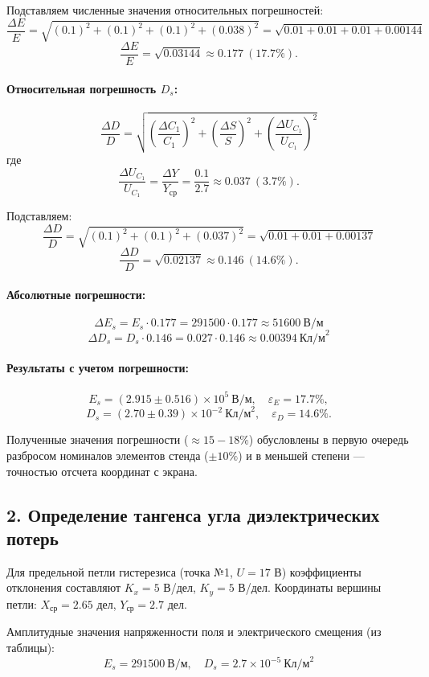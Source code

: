 \documentclass[a4paper,14pt]{article}
\begin{document}
Подставляем численные значения относительных погрешностей:
\[
\frac{\Delta E}{E} = \sqrt{ (0.1)^2 + (0.1)^2 + (0.1)^2 + (0.038)^2 } = \sqrt{ 0.01 + 0.01 + 0.01 + 0.00144 }
\]
\[
\frac{\Delta E}{E} = \sqrt{0.03144} \approx 0.177 \ (17.7\%).
\]

\paragraph{Относительная погрешность \(D_s\):}
\[
\frac{\Delta D}{D} = \sqrt{ \left( \frac{\Delta C_1}{C_1} \right)^2 + \left( \frac{\Delta S}{S} \right)^2 + \left( \frac{\Delta U_{C_1}}{U_{C_1}} \right)^2 }
\]
где
\[
\frac{\Delta U_{C_1}}{U_{C_1}} = \frac{\Delta Y}{Y_{ср}} = \frac{0.1}{2.7} \approx 0.037 \ (3.7\%).
\]

Подставляем:
\[
\frac{\Delta D}{D} = \sqrt{ (0.1)^2 + (0.1)^2 + (0.037)^2 } = \sqrt{ 0.01 + 0.01 + 0.00137 }
\]
\[
\frac{\Delta D}{D} = \sqrt{0.02137} \approx 0.146 \ (14.6\%).
\]

\paragraph{Абсолютные погрешности:}
\[
\Delta E_s = E_s \cdot 0.177 = 291500 \cdot 0.177 \approx 51600 \ \text{В/м}
\]
\[
\Delta D_s = D_s \cdot 0.146 = 0.027 \cdot 0.146 \approx 0.00394 \ \text{Кл/м}^2
\]

\paragraph{Результаты с учетом погрешности:}
\[
E_s = (2.915 \pm 0.516) \times 10^5 \ \text{В/м}, \quad \varepsilon_E = 17.7\%,
\]
\[
D_s = (2.70 \pm 0.39) \times 10^{-2} \ \text{Кл/м}^2, \quad \varepsilon_D = 14.6\%.
\]

Полученные значения погрешности (\(\approx 15-18\%\)) обусловлены в первую очередь разбросом номиналов элементов стенда (\(\pm 10\%\)) и в меньшей степени — точностью отсчета координат с экрана.
\subsection*{2. Определение тангенса угла диэлектрических потерь}

Для предельной петли гистерезиса (точка №1, \(U = 17\) В) коэффициенты отклонения составляют \(K_x = 5\) В/дел, \(K_y = 5\) В/дел. Координаты вершины петли: \(X_{ср} = 2.65\) дел, \(Y_{ср} = 2.7\) дел.

Амплитудные значения напряженности поля и электрического смещения (из таблицы):
\[
E_s = 291500 \ \text{В/м}, \quad D_s = 2.7 \times 10^{-5} \ \text{Кл/м}^2
\]
\end{document}

